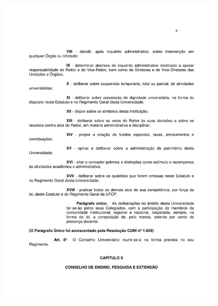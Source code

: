 \begin{figure}[p]
	\centering 
	\includegraphics[scale=0.7]{capitulos/resolucoes/cuni414/cuni414-6.pdf}
\end{figure} \pagebreak

